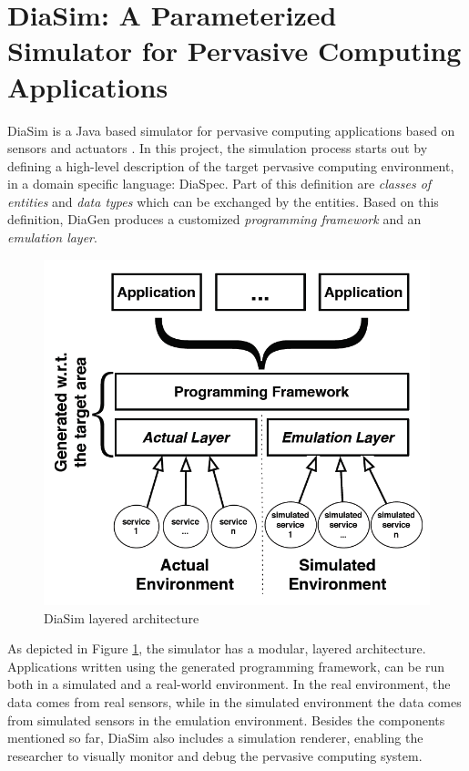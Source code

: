 
\section{DiaSim: A Parameterized Simulator for Pervasive Computing Applications}\label{sec:ubiwise}

DiaSim is a Java based simulator for pervasive computing applications based on sensors and actuators \cite{bruneau2013diasim}. In this project, the simulation process starts out by defining a high-level description of the target pervasive computing environment, in a domain specific language: DiaSpec. Part of this definition are \emph{classes of entities} and \emph{data types} which can be exchanged by the entities. Based on this definition, DiaGen produces a customized \emph{programming framework} and an \emph{emulation layer}.\\

\begin{figure}[H]
	\centering
	\includegraphics[width=\linewidth]{gfx/Chapter2/diasim_layered_architecture}
	\caption{DiaSim layered architecture}
	\label{fig:diasim_architecture}
\end{figure}

As depicted in Figure \ref{fig:diasim_architecture}, the simulator has a modular, layered architecture. Applications written using the generated programming framework, can be run both in a simulated and a real-world environment. In the real environment, the data comes from real sensors, while in the simulated environment the data comes from simulated sensors in the emulation environment. Besides the components mentioned so far, DiaSim also includes a simulation renderer, enabling the researcher to visually monitor and debug the pervasive computing system.\\

